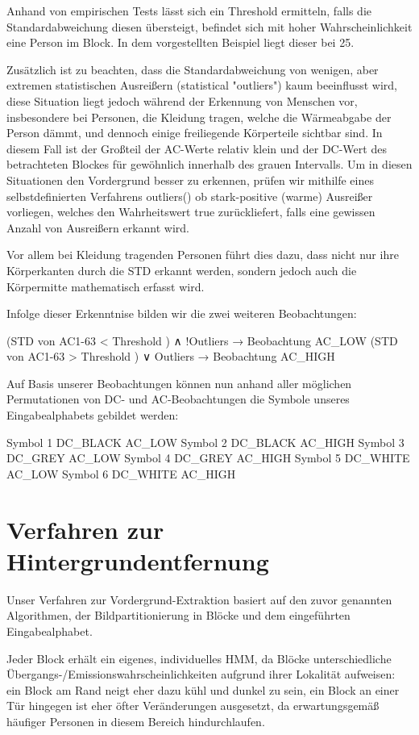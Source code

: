 Anhand von empirischen Tests lässt sich ein Threshold ermitteln, falls die Standardabweichung diesen übersteigt, befindet sich mit hoher Wahrscheinlichkeit eine Person im Block. In dem vorgestellten Beispiel liegt dieser bei 25.

Zusätzlich ist zu beachten, dass die Standardabweichung von wenigen, aber extremen statistischen Ausreißern (statistical "outliers") kaum beeinflusst wird, diese Situation liegt  jedoch während der Erkennung von Menschen vor, insbesondere bei Personen, die Kleidung tragen, welche die Wärmeabgabe der Person dämmt, und dennoch einige freiliegende Körperteile sichtbar sind. In diesem Fall ist der Großteil der AC-Werte relativ klein und der DC-Wert des betrachteten Blockes für gewöhnlich innerhalb des grauen Intervalls. Um in diesen Situationen den Vordergrund besser zu erkennen, prüfen wir mithilfe eines selbstdefinierten Verfahrens outliers() ob stark-positive (warme) Ausreißer vorliegen, welches den Wahrheitswert true zurückliefert, falls eine gewissen Anzahl von Ausreißern erkannt wird.

Vor allem bei Kleidung tragenden Personen führt dies dazu, dass nicht nur ihre Körperkanten durch die STD erkannt werden, sondern jedoch auch die Körpermitte mathematisch erfasst wird.


Infolge dieser Erkenntnise bilden wir die zwei weiteren Beobachtungen:

(STD von AC1-63 < Threshold ) ∧ !Outliers →  Beobachtung AC\_LOW
(STD von AC1-63 > Threshold ) ∨ Outliers →  Beobachtung AC\_HIGH


Auf Basis unserer Beobachtungen können nun anhand aller möglichen Permutationen von DC- und AC-Beobachtungen die Symbole unseres Eingabealphabets gebildet werden:

Symbol 1
DC\_BLACK
AC\_LOW
Symbol 2
DC\_BLACK
AC\_HIGH
Symbol 3
DC\_GREY
AC\_LOW
Symbol 4
DC\_GREY
AC\_HIGH
Symbol 5
DC\_WHITE
AC\_LOW
Symbol 6
DC\_WHITE
AC\_HIGH

\section{Verfahren zur Hintergrundentfernung}

Unser Verfahren zur Vordergrund-Extraktion basiert auf den zuvor genannten  Algorithmen, der Bildpartitionierung in Blöcke und dem eingeführten Eingabealphabet.

Jeder Block erhält ein eigenes, individuelles HMM, da Blöcke unterschiedliche Übergangs-/Emissionswahrscheinlichkeiten aufgrund ihrer Lokalität aufweisen: ein Block am Rand neigt eher dazu kühl und dunkel zu sein, ein Block an einer Tür hingegen ist eher öfter Veränderungen ausgesetzt, da erwartungsgemäß häufiger Personen in diesem Bereich hindurchlaufen. 

